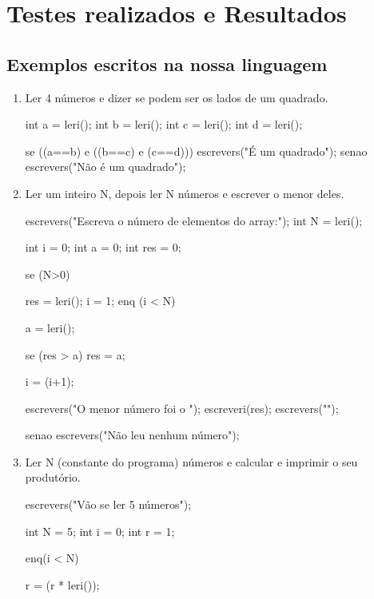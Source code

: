 \documentclass{report}
\begin{document}
\section{Testes realizados e Resultados}
\subsection{Exemplos escritos na nossa linguagem}

\begin{enumerate}
	\item Ler 4 números e dizer se podem ser os lados de um quadrado.\\
	
	\begin{code}
		int a = leri();
		int b = leri();
		int c = leri();
		int d = leri();
	
		se ((a==b) e ((b==c) e (c==d))) {
			escrevers("É um quadrado\n");
		}
		senao {
			escrevers("Não é um quadrado\n");
		}
	\end{code}	
	
	\item Ler um inteiro N, depois ler N números e escrever o menor deles.\\
	
	\begin{code}
		escrevers("Escreva o número de elementos do array:\n");
		int N = leri();
		
		int i = 0;
		int a = 0;
		int res = 0;
		
		se (N>0){
			res = leri();
			i = 1;
			enq (i < N){
				a = leri();
				
				se (res > a){
					res = a;
				}
				
				i = (i+1);
			}
			
			
			escrevers("O menor número foi o ");
			escreveri(res);
			escrevers("\n");
			
		}
		senao{
			escrevers("Não leu nenhum número\n");
		}
	\end{code}
	
	\item Ler N (constante do programa) números e calcular e imprimir o seu produtório.\\
	
	\begin{code}
		escrevers("Vão se ler 5 números\n");
		
		int N = 5;
		int i = 0;
		int r = 1;
		
		enq(i < N){
			
			r = (r * leri());
			
}
\end{code}
\end{enumerate}
\end{document}
